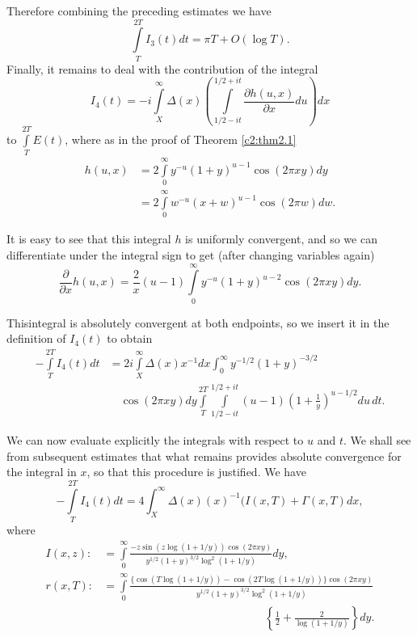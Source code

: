 Therefore combining the preceding estimates we have
$$
\int\limits_T^{2T} I_3 (t) dt = \pi T + O(\log T).
$$
Finally, it remains to deal with the contribution of the integral 
$$
I_4 (t) = - i \int\limits_X^\infty \Delta(x) \left(\int\limits_{1/2-
  it}^{1/2 + it}  \frac{\partial h (u, x)}{\partial x}du \right) dx
$$
to $\int\limits_T^{2T} E(t)$, where as in the proof of Theorem
\ref{c2:thm2.1}
\begin{align*}
h(u, x) &= 2 \int\limits_0^\infty y^{-u} (1+ y)^{u-1} \cos (2 \pi x
y)dy\\
&= 2 \int\limits_{0}^\infty w^{-u} (x+ w)^{u-1} \cos (2 \pi w) dw.
\end{align*}

It is easy to see that this integral $h$ is uniformly convergent, and
so we can differentiate under the integral sign to get (after changing
variables again)
$$
\frac{\partial}{\partial x} h (u, x) = \frac{2}{x} (u-1)
\int\limits_0^\infty y^{-u} (1+y)^{u-2} \cos (2 \pi xy) dy.
$$

This\pageoriginale integral is absolutely convergent at both
endpoints, so we insert it in the definition of $I_4 (t)$ to obtain
\begin{align*}
  - \int\limits_T^{2T} I_4 (t) dt
  &= 2 i \int\limits_X^\infty \Delta (x) x^{-1} dx \int_0^\infty y^{-
    1/2} (1+ y)^{-3/2}\\ 
  &\quad \cos (2 \pi xy) dy \int\limits_T^{2T}
  \int\limits_{1/2- it}^{1/2 + it} (u-1) \left(1+ \frac{1}{y}
  \right)^{u- 1/2} du \, dt.
\end{align*}

We can now evaluate explicitly the integrals with respect to $u$ and
$t$. We shall see from subsequent estimates that what remains provides
absolute convergence for the integral in $x$, so that this procedure
is justified. We have
\begin{equation}
  - \int\limits_T^{2T} I_4 (t) dt = 4 \int_X^\infty \Delta (x)
  (x)^{-1} (I (x, T)+ \Gamma (x, T) dx,\label{c3:eq3.14}
\end{equation}
where 
\begin{align*}
  I (x, z): & = \int\limits_0^\infty \frac{- z\sin (z \log (1+ 1/y))
    \cos (2 \pi xy)}{y^{1/2} (1+ y)^{3/2} \log ^2 (1+ 1/y)}dy,\\
  r (x, T): & = \int\limits_0^\infty \frac{\{ \cos (T \log (1+ 1/y)) -
    \cos (2 T \log (1+ 1/y))\} \cos (2 \pi x y)}{y^{1/2} (1+ y)^{3/2}
    \log^2 (1+ 1/y)}\\
  & \hspace{6cm}\left\{\frac{1}{2} +  \frac{2}{\log (1+ 1/y)} \right\}dy.
\end{align*}


